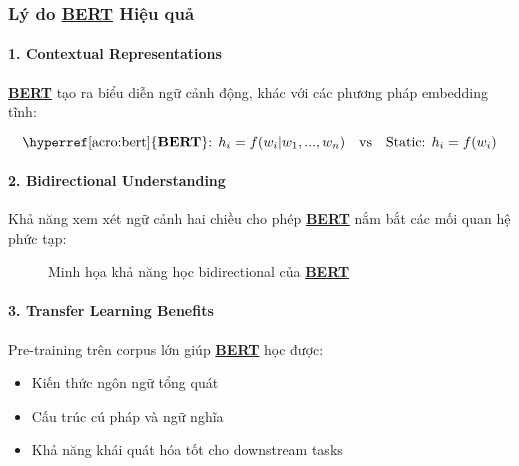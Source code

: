 \subsubsection{Lý do \hyperref[acro:bert]{\textbf{BERT}} Hiệu quả}

\paragraph{1.
Contextual Representations}
\hyperref[acro:bert]{\textbf{BERT}} tạo ra biểu diễn ngữ cảnh động, khác với các phương pháp embedding tĩnh:

\begin{equation}
\text{\hyperref[acro:bert]{\textbf{BERT}}: } h_i = f(w_i | w_1, ..., w_n) \quad \text{vs} \quad \text{Static: } h_i = f(w_i)
\end{equation}

\paragraph{2.
Bidirectional Understanding}
Khả năng xem xét ngữ cảnh hai chiều cho phép \hyperref[acro:bert]{\textbf{BERT}} nắm bắt các mối quan hệ phức tạp:

\begin{figure}[H]
\centering
{}
\caption{Minh họa khả năng học bidirectional của \hyperref[acro:bert]{\textbf{BERT}}}
\label{fig:bidirectional}
\end{figure}

\paragraph{3.
Transfer Learning Benefits}
Pre-training trên corpus lớn giúp \hyperref[acro:bert]{\textbf{BERT}} học được:
\begin{itemize}
    \item Kiến thức ngôn ngữ tổng quát
    \item Cấu trúc cú pháp và ngữ nghĩa
    \item Khả năng khái quát hóa tốt cho downstream tasks
\end{itemize}

